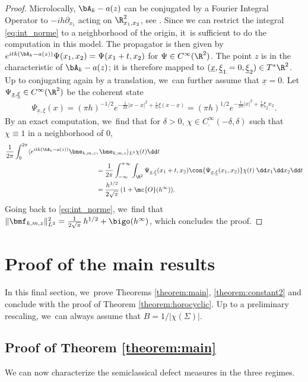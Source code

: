 \begin{proof}
Microlocally, $\bA_k-a(z)$ can be conjugated by a
Fourier Integral Operator to $-ih\partial_{x_1}$ acting on
$\R^2_{x_1, x_2}$, see \cite[Th.\,12.3]{Zworski-12}. Since we can restrict the integral \eqref{eq:int_norme} to a
neighborhood of the origin, it~is sufficient to do the computation in this
model. The propagator is then given by $e^{itk(\bA_k-a(z))} \Psi (x_1, x_2) = \Psi (x_1 +t, x_2)$ for $\Psi \in C^\infty(\R^2)$. The point $z$ is in the characteristic of $\bA_k-a(z)$; it is therefore mapped to \hbox{$(\underline{x}, \underline{\xi}_1=0,\underline{\xi}_2) \in T^*\R^2$}. Up to conjugating again by a translation, we~can further assume that $\underline{x}=0$. Let
$\Psi_{\underline{x}, \underline{\xi}} \in C^\infty (\R^2)$ be
the coherent state
\[
\Psi_{\underline{x}, \underline{\xi}} (x) = (\pi h)^{-1/2} e^{ -
\frac{1}{2h} | x - \underline{x}|^2 + \frac{i}{h} \underline{\xi} (x - \underline{x}) } = (\pi h)^{1/2}e^{ -
\frac{1}{2h} | x|^2 + \frac{i}{h} \underline{\xi}_2 x_2 }.\]
By an exact computation, we~find that for $\delta > 0$, $\chi \in C^\infty_{{\comp}}(-\delta,\delta)$ such that $\chi \equiv 1$ in a neighborhood of $0$,
\[
\begin{split} \frac{1}{2 \pi } \int_0^{2 \pi } \langle e^{itk(\bA_k-a(z))} \bme_{k,m,z}&,\bme_{k,m,z} \rangle_{L^2} \chi(t)  \dd t \\
& = \frac{1}{2\pi} \int_{-\infty}^{+\infty} \int_{\R^2} \Psi _{ \underline{x},
\underline{\xi} } (x_1 + t, x_2) \con { \Psi_{ \underline{x}, \underline{\xi} } (x_1,
x_2)} \chi(t) \; \dd x_1 \dd x_2 \dd t \\
& = \frac{ h^{1/2}}{2 \sqrt \pi }\,(1+ \mc{O}(h^\infty)).
\end{split}
\]
Going back to \eqref{eq:int_norme}, we~find that $ \|\bmf_{k,m,z}\|^2_{L^2} =
\tfrac{1}{ 2 \sqrt \pi}\, h^{1/2} + \bigo (h^{\infty})$, which
concludes the proof.
\end{proof}

\section{Proof of the main results}

\label{section:proofs}

In this final section, we~prove Theorems \ref{theorem:main}, \ref{theorem:constant2} and conclude with the proof of Theorem \ref{theorem:horocyclic}. Up to a preliminary rescaling, we~can always assume that $B=1/|\chi(\Sigma)|$.

\subsection{Proof of Theorem \ref{theorem:main}} We can now characterize the semiclassical defect measures in the three regimes.

